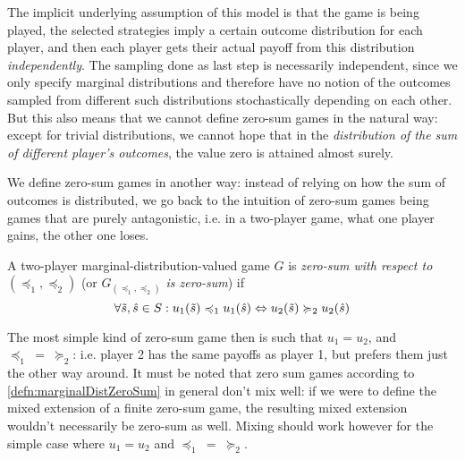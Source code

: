 \documentclass[a4paper]{scrreprt}
\DeclareMathOperator{\releq}{\;=\;}
\begin{document}
    The implicit underlying assumption of this model is that the game is being played, the selected strategies imply a certain outcome distribution for each player, and then each player gets their actual payoff from this distribution \emph{independently}. The sampling done as last step is necessarily independent, since we only specify marginal distributions and therefore have no notion of the outcomes sampled from different such distributions stochastically depending on each other.
    But this also means that we cannot define zero-sum games in the natural way: 
    except for trivial distributions, we cannot hope that in the \emph{distribution of the sum of different player's outcomes}, the value zero is attained almost surely.
    
    We define zero-sum games in another way: instead of relying on how the sum of outcomes is distributed, we go back to the intuition of zero-sum games being games that are purely antagonistic, i.e. in a two-player game, what one player gains, the other one loses.
    
    \begin{defn}
        A two-player marginal-distribution-valued game $G$ is \emph{zero-sum with respect to $(\preccurlyeq_1, \preccurlyeq_2)$} (or \emph{$G_{(\preccurlyeq_1, \preccurlyeq_2)}$ is zero-sum}) if
        \[
            \forall \tilde{s}, \hat{s} \in S: 
            u_1(\tilde{s}) \preccurlyeq_1 u_1(\hat{s}) \Leftrightarrow u_2(\tilde{s}) \succcurlyeq_2 u_2(\hat{s})
        \]
        \label{defn:marginalDistZeroSum}
    \end{defn}
    The most simple kind of zero-sum game then is such that $u_1 = u_2$, and $\preccurlyeq_1 \releq \succcurlyeq_2$: i.e. player 2 has the same payoffs as player 1, but prefers them just the other way around.
    It must be noted that zero sum games according to \ref{defn:marginalDistZeroSum} in general don't mix well: if we were to define the mixed extension of a finite zero-sum game, the resulting mixed extension wouldn't necessarily be zero-sum as well. Mixing should work however for the simple case where $u_1 = u_2$ and $\preccurlyeq_1 \releq \succcurlyeq_2$.
    
\end{document}
